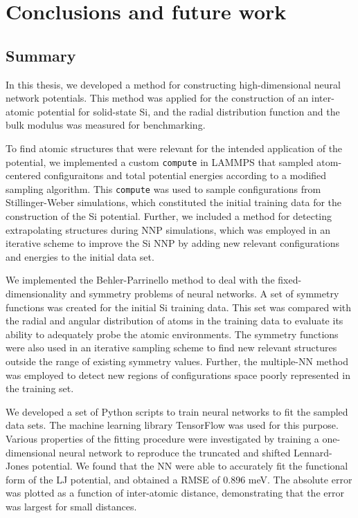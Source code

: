 \documentclass[twoside,english]{uiofysmaster}
\begin{document}
\part{Conclusions and future work}

\chapter{Summary}
In this thesis, we developed a method for constructing high-dimensional neural network potentials. This method was applied
for the construction of an inter-atomic potential for solid-state Si, and the radial distribution function and 
the bulk modulus was measured for benchmarking.

To find atomic structures that were relevant for the intended application of the potential, 
we implemented a custom \texttt{compute} in LAMMPS 
that sampled atom-centered configuraitons and total potential energies according to a modified sampling algorithm. 
This \texttt{compute} was used to sample configurations from Stillinger-Weber simulations, which constituted the initial 
training data for the construction of the Si potential. 
Further, we included a method for detecting extrapolating structures during NNP simulations, which was employed in 
an iterative scheme to improve the Si NNP by adding new relevant configurations and energies to the initial data set. 

We implemented the Behler-Parrinello method to deal with the fixed-dimensionality and symmetry problems of neural networks. 
A set of symmetry functions was created for the initial Si training data. This set was compared with 
the radial and angular distribution of atoms in the training data to evaluate its ability to adequately probe 
the atomic environments. The symmetry functions were also used in an iterative sampling scheme to find new relevant structures 
outside the range of existing symmetry values. Further, the multiple-NN method was employed to detect
new regions of configurations space poorly represented in the training set. 

We developed a set of Python scripts to train neural networks to fit the sampled data sets. 
The machine learning library TensorFlow was used for this purpose. Various properties of the fitting procedure were 
investigated by training a one-dimensional neural network to reproduce the truncated and shifted Lennard-Jones potential.
We found that the NN were able to accurately fit the functional form of the LJ potential, and obtained a RMSE 
of 0.896 meV. The absolute error was plotted as a function of inter-atomic distance, demonstrating that the error 
was largest for small distances. 
\end{document}

